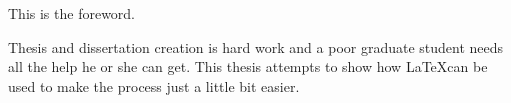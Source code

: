 \documentclass[11pt,doublespace]{unhthesis}
\begin{document}
\begin{foreword}                                        %
     This is the foreword.                              %
\end{foreword}                                          %

\tableofcontents                                        %
\listoftables                                           %
\listoffigures                                          %



\begin{abstractpage}                            %
   Thesis and dissertation creation is hard     %
   work and a poor graduate student needs all   %
   the help he or she can get.  This thesis     %
   attempts to show how \LaTeX can be used to   %
   make the process just a little bit easier.   %
\end{abstractpage}                              %




\end{document}
